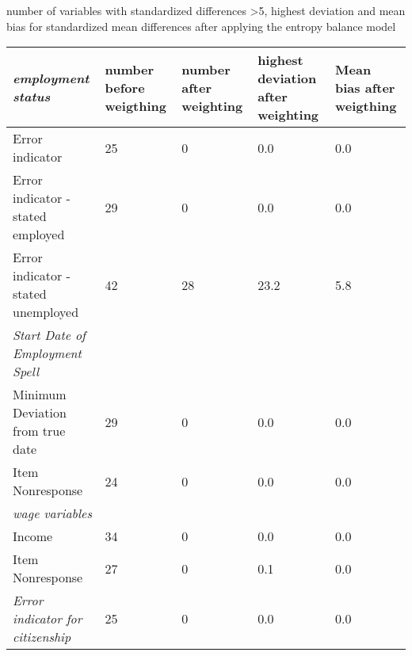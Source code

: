 \newpage
\begin{threeparttable}
\caption{number of variables with standardized differences \textgreater 5, highest deviation and mean bias for standardized mean differences after applying the entropy balance model}
\label{tab:achieved_balance}
\begin{tabular}{p{5cm}p{1.5cm}p{1.5cm}p{1.5cm}p{1.5cm}} 
\cmidrule(r{0.25em}){2-5} 		
\textit{employment status} &	number before weigthing	&	number after weighting	&	highest deviation after weighting	&	Mean bias after weigthing \\	
\midrule
Error indicator	&	25	&	0	&	0.0	&	0.0	\\
Error indicator - stated employed	&	29	&	0	&	0.0	&	0.0		\\
Error indicator - stated unemployed	&	42	&	28	&	23.2	&	5.8	\\
\addlinespace
\textit{Start Date of Employment Spell}	\\
Minimum Deviation from true date	&	29	&	0	&	0.0	&	0.0	\\
Item Nonresponse	&	24	&	0	&	0.0	&	0.0	\\
\addlinespace
\textit{wage variables}	\\
Income	&	34	&	0	&	0.0	&	0.0	 \\
Item Nonresponse	&	27	&	0	&	0.1	&	0.0	\\
\textit{Error indicator for citizenship}	&	25	&	0	&	0.0	&	0.0 \\
\end{tabular}
\vspace{.5em}
    \begin{tablenotes}\small

    \end{tablenotes}
\end{threeparttable}


